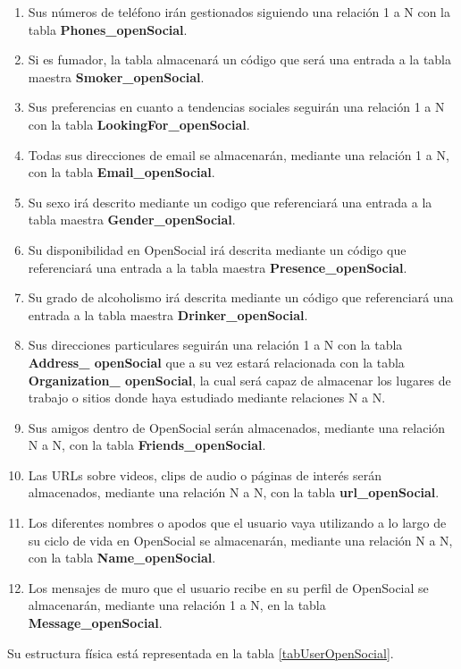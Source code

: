 \begin{enumerate}
\item Sus números de teléfono irán gestionados siguiendo una relación 1 a N con la tabla \textbf{Phones\_openSocial}.
\item Si es fumador, la tabla almacenará un código que será una entrada a la tabla maestra \textbf{Smoker\_openSocial}.
\item Sus preferencias en cuanto a tendencias sociales seguirán una relación 1 a N con la tabla \textbf{LookingFor\_openSocial}.
\item Todas sus direcciones de email se almacenarán, mediante una relación 1 a N, con la tabla \textbf{Email\_openSocial}.
\item Su sexo irá descrito mediante un codigo que referenciará una entrada a la tabla maestra \textbf{Gender\_openSocial}.
\item Su disponibilidad en OpenSocial irá descrita mediante un código que referenciará una entrada a la tabla maestra \textbf{Presence\_openSocial}.
\item Su grado de alcoholismo irá descrita mediante un código que referenciará una entrada a la tabla maestra \textbf{Drinker\_openSocial}.
\item Sus direcciones particulares seguirán una relación 1 a N con la tabla \textbf{Address\_ openSocial} que a su vez estará relacionada con la tabla \textbf{Organization\_ openSocial}, la cual será capaz de almacenar los lugares de trabajo o sitios donde haya estudiado mediante relaciones N a N.
\item Sus amigos dentro de OpenSocial serán almacenados, mediante una relación N a N, con la tabla \textbf{Friends\_openSocial}.
\item Las URLs sobre videos, clips de audio o páginas de interés serán almacenados, mediante una relación N a N, con la tabla \textbf{url\_openSocial}.
\item Los diferentes nombres o apodos que el usuario vaya utilizando a lo largo de su ciclo de vida en OpenSocial se almacenarán, mediante una relación N a N, con la tabla \textbf{Name\_openSocial}.
\item Los mensajes de muro que el usuario recibe en su perfil de OpenSocial se almacenarán, mediante una relación 1 a N, en la tabla \textbf{Message\_openSocial}.
\end{enumerate}


Su estructura física está representada en la tabla \ref{tabUserOpenSocial}.


